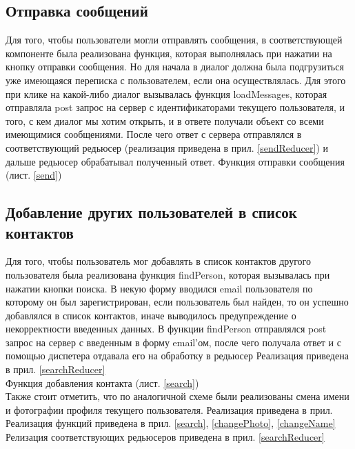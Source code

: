 \documentclass[14pt,final]{report}
\begin{document}
\subsection{Отправка сообщений}
Для того, чтобы пользователи могли отправлять сообщения, в соответствующей компоненте была реализована функция, которая выполнялась при нажатии на кнопку отправки сообщения. Но для начала в диалог должна была подгрузиться уже имеющаяся переписка с пользователем, если она осуществлялась. Для этого при клике на какой-либо диалог вызывалась функция loadMessages, которая отправляла post запрос на сервер с идентификаторами текущего пользователя, и того, с кем диалог мы хотим открыть, и в ответе получали объект со всеми имеющимися сообщениями. После чего ответ с сервера отправлялся в соответствующий редьюсер (реализация приведена в прил. \ref{sendReducer}) и дальше редьюсер обрабатывал полученный ответ.
Функция отправки сообщения (лист. \ref{send})


\subsection{Добавление других пользователей в список контактов}
Для того, чтобы пользователь мог добавлять в список контактов другого пользователя была реализована функция findPerson, которая вызывалась при нажатии кнопки поиска. В некую форму вводился email пользователя по которому он был зарегистрирован, если пользователь был найден, то он успешно добавлялся в список контактов, иначе выводилось предупреждение о некорректности введенных данных. В функции findPerson отправлялся post запрос на сервер с введенным в форму email'ом, после чего получала ответ и с помощью диспетера отдавала его на обработку в редьюсер Реализация приведена в прил. \ref{searchReducer}\\
Функция добавления контакта (лист. \ref{search})
\\
Также стоит отметить, что по аналогичной схеме были реализованы смена имени и фотографии профиля текущего пользователя. Реализация приведена в прил.\\ Реализация функций приведена в прил. \ref{search}, \ref{changePhoto}, \ref{changeName}\\
Релизация соответствующих редьюсеров приведена в прил. \ref{searchReducer}\\
\end{document}
